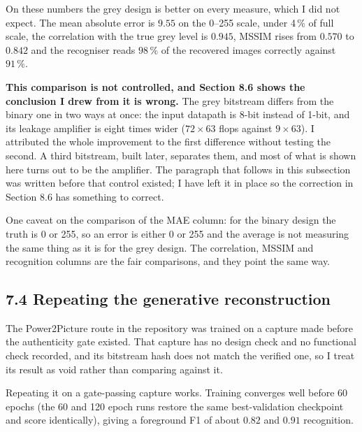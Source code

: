 \documentclass[11pt,a4paper]{article}
\begin{document}
\begin{table}[h]
  \centering
  \small
  \resizebox{\textwidth}{!}{}
  \caption{The same generator, the same split, the same number of images; only the
  hardware design changes. MAE and correlation are between the recovered and the true
  grey levels.}
  \label{tab:grey}
\end{table}

On these numbers the grey design is better on every measure, which I did not expect.
The mean absolute error is $9.55$ on the 0--255 scale, under 4\,\% of full scale, the
correlation with the true grey level is $0.945$, MSSIM rises from $0.570$ to $0.842$ and
the recogniser reads $98\,\%$ of the recovered images correctly against $91\,\%$.

\textbf{This comparison is not controlled, and Section 8.6 shows the conclusion I drew
from it is wrong.} The grey bitstream differs from the binary one in two ways at once:
the input datapath is 8-bit instead of 1-bit, and its leakage amplifier is eight times
wider ($72\times63$ flops against $9\times63$). I attributed the whole improvement to the
first difference without testing the second. A third bitstream, built later, separates
them, and most of what is shown here turns out to be the amplifier. The paragraph that
follows in this subsection was written before that control existed; I have left it in
place so the correction in Section 8.6 has something to correct.

One caveat on the comparison of the MAE column: for the binary design the truth is 0 or
255, so an error is either 0 or 255 and the average is not measuring the same thing as it
is for the grey design. The correlation, MSSIM and recognition columns are the fair
comparisons, and they point the same way.

\subsection*{7.4 Repeating the generative reconstruction}

The Power2Picture route in the repository was trained on a capture made before the
authenticity gate existed. That capture has no design check and no functional check
recorded, and its bitstream hash does not match the verified one, so I treat its result
as void rather than comparing against it.

Repeating it on a gate-passing capture works. Training converges well before 60 epochs
(the 60 and 120 epoch runs restore the same best-validation checkpoint and score
identically), giving a foreground F1 of about $0.82$ and $0.91$ recognition.
\end{document}
